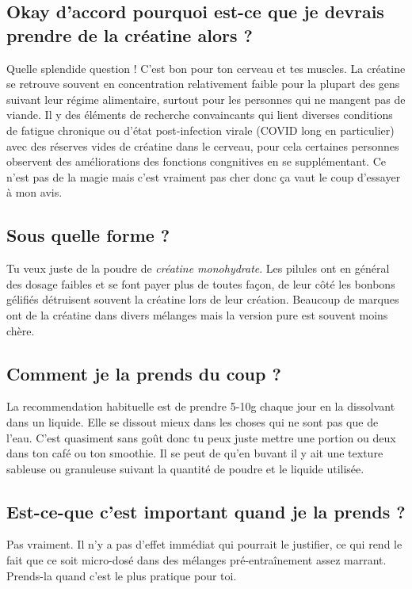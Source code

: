 \documentclass{article}
\begin{document}
\subsection{Okay d'accord pourquoi est-ce que je devrais prendre de la créatine alors ?}

Quelle splendide question ! C'est bon pour ton cerveau et tes muscles. La créatine se retrouve souvent en concentration relativement faible pour la plupart des gens suivant leur régime alimentaire, surtout pour les personnes qui ne mangent pas de viande. Il y des éléments de recherche convaincants qui lient diverses conditions de fatigue chronique ou d'état post-infection virale (COVID long en particulier) avec des réserves vides de créatine dans le cerveau, pour cela certaines personnes observent des améliorations des fonctions congnitives en se supplémentant. Ce n'est pas de la magie mais c'est vraiment pas cher donc ça vaut le coup d'essayer à mon avis.

\subsection{Sous quelle forme ?}

Tu veux juste de la poudre de \textit{créatine monohydrate}. Les pilules ont en général des dosage faibles et se font payer plus de toutes façon, de leur côté les bonbons gélifiés détruisent souvent la créatine lors de leur création. Beaucoup de marques ont de la créatine dans divers mélanges mais la version pure est souvent moins chère.

\subsection{Comment je la prends du coup ?}

La recommendation habituelle est de prendre 5-10g chaque jour en la dissolvant dans un liquide. Elle se dissout mieux dans les choses qui ne sont pas que de l'eau. C'est quasiment sans goût donc tu peux juste mettre une portion ou deux dans ton café ou ton smoothie. Il se peut de qu'en buvant il y ait une texture sableuse ou granuleuse suivant la quantité de poudre et le liquide utilisée. 

\subsection{Est-ce-que c'est important quand je la prends ?}

Pas vraiment. Il n'y a pas d'effet immédiat qui pourrait le justifier, ce qui rend le fait que ce soit micro-dosé dans des mélanges pré-entraînement assez marrant. Prends-la quand c'est le plus pratique pour toi.
\end{document}

